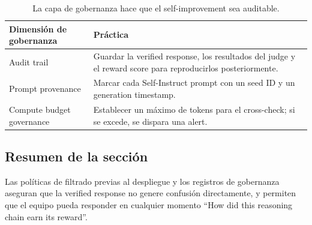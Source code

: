 \begin{table}[H]
\centering
\begin{tabular}{p{5cm}p{10cm}}
\toprule
Dimensión de gobernanza & Práctica \\
\midrule
Audit trail & Guardar la verified response, los resultados del judge y el reward score para reproducirlos posteriormente. \\
Prompt provenance & Marcar cada Self-Instruct prompt con un seed ID y un generation timestamp. \\
Compute budget governance & Establecer un máximo de tokens para el cross-check; si se excede, se dispara una alert. \\
\bottomrule
\end{tabular}
\caption{La capa de gobernanza hace que el self-improvement sea auditable.}
\end{table}

\subsection{Resumen de la sección}
Las políticas de filtrado previas al despliegue y los registros de gobernanza aseguran que la verified response no genere confusión directamente, y permiten que el equipo pueda responder en cualquier momento ``How did this reasoning chain earn its reward''.

